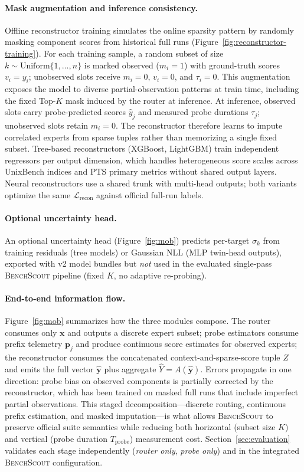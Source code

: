 \documentclass[sigplan,10pt]{acmart}
\newcommand{\ourmethod}{\textsc{BenchScout}\xspace}
\begin{document}
\paragraph{Mask augmentation and inference consistency.}
Offline reconstructor training simulates the online sparsity pattern by randomly masking component scores from historical full runs (Figure~\ref{fig:reconstructor-training}).
For each training sample, a random subset of size $k \sim \mathrm{Uniform}\{1,\ldots,n\}$ is marked observed ($m_i{=}1$) with ground-truth scores $v_i{=}y_i$; unobserved slots receive $m_i{=}0$, $v_i{=}0$, and $\tau_i{=}0$.
This augmentation exposes the model to diverse partial-observation patterns at train time, including the fixed Top-$K$ mask induced by the router at inference.
At inference, observed slots carry probe-predicted scores $\hat{y}_j$ and measured probe durations $\tau_j$; unobserved slots retain $m_i{=}0$.
The reconstructor therefore learns to impute correlated experts from sparse tuples rather than memorizing a single fixed subset.
Tree-based reconstructors (XGBoost, LightGBM) train independent regressors per output dimension, which handles heterogeneous score scales across UnixBench indices and PTS primary metrics without shared output layers.
Neural reconstructors use a shared trunk with multi-head outputs; both variants optimize the same $\mathcal{L}_{\mathrm{recon}}$ against official full-run labels.

\paragraph{Optional uncertainty head.}
\label{subsec:uncertainty-estimator}
An optional uncertainty head (Figure~\ref{fig:mob}) predicts per-target $\sigma_k$ from training residuals (tree models) or Gaussian NLL (MLP twin-head outputs), exported with v2 model bundles but \emph{not} used in the evaluated single-pass \ourmethod{} pipeline (fixed $K$, no adaptive re-probing).

\paragraph{End-to-end information flow.}
Figure~\ref{fig:mob} summarizes how the three modules compose.
The router consumes only $\mathbf{x}$ and outputs a discrete expert subset; probe estimators consume prefix telemetry $\mathbf{p}_j$ and produce continuous score estimates for observed experts; the reconstructor consumes the concatenated context-and-sparse-score tuple $Z$ and emits the full vector $\hat{\mathbf{y}}$ plus aggregate $\hat{Y}=A(\hat{\mathbf{y}})$.
Errors propagate in one direction: probe bias on observed components is partially corrected by the reconstructor, which has been trained on masked full runs that include imperfect partial observations.
This staged decomposition---discrete routing, continuous prefix estimation, and masked imputation---is what allows \ourmethod to preserve official suite semantics while reducing both horizontal (subset size $K$) and vertical (probe duration $T_{\mathrm{probe}}$) measurement cost.
Section~\ref{sec:evaluation} validates each stage independently (\emph{router only}, \emph{probe only}) and in the integrated \ourmethod{} configuration.
\end{document}
